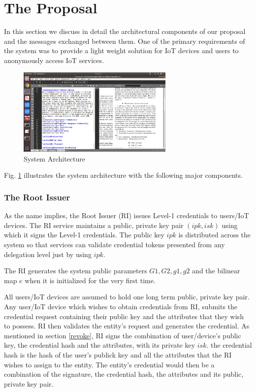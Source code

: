 \documentclass[journal]{IEEEtran}
\begin{document}
\section{The Proposal} \label{proposal}
In this section we discuss in detail the architectural components of our proposal and the messages exchanged between them. One of the primary requirements of the system was to provide a light weight solution for IoT devices and users to anonymously access IoT services. 

\begin{figure}[htbp]
\centerline{\includegraphics[width=3in]{dac.png}}
\caption{System Architecture}
\label{fig:sysarch}
\end{figure}

Fig. \ref{fig:sysarch} illustrates the system architecture with the following major components.

\subsubsection{The Root Issuer}
As the name implies, the Root Issuer (RI) issues Level-1 credentials to users/IoT devices. The RI service maintains a public, private key pair $(ipk,isk)$ using which it signs the Level-1 credentials. The public key $ipk$ is distributed across the system so that services can validate credential tokens presented from any delegation level just by using $ipk$.

The RI generates the system public parameters $G1, G2, g1, g2$ and the bilinear map $e$ when it is initialized for the very first time.

All users/IoT devices are assumed to hold one long term public, private key pair. Any user/IoT device which wishes to obtain credentials from RI, submits the credential request containing their public key and the attributes that they wish to possess. RI then validates the entity's request and generates the credential. As mentioned in section \ref{revoke}, RI signs the combination of user/device's public key, the credential hash and the attributes, with its private key $isk$. the credential hash is the hash of the user's publick key and all the attributes that the RI wishes to assign to the entity. The entity's credential would then be a combination of the signature, the credential hash, the attributes and its public, private key pair.
\end{document}
